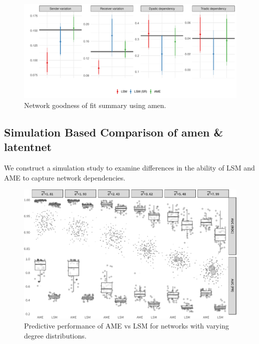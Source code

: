 \documentclass[12pt,pdflatex]{elsarticle}
\newcommand{\pkg}[1]{{\fontseries{b}\selectfont #1}}
\begin{document}
\begin{figure}[ht]
	\centering
	\includegraphics[width=1\textwidth]{netPerfCoef_latSpaceSmall}
	\caption{Network goodness of fit summary using \pkg{amen}.}
	\label{fig:netPerfCoef_latSpace}
\end{figure}

\FloatBarrier

\subsection*{Simulation Based Comparison of \pkg{amen} \& \pkg{latentnet}}

We construct a simulation study to examine differences in the ability of LSM and AME to capture network dependencies. 

\begin{figure}[ht]
	\centering
	\includegraphics[width=1\textwidth]{sim1Viz_nets.pdf}
	\caption{Predictive performance of AME vs LSM for networks with varying degree distributions. }
\end{figure}
\end{document}
